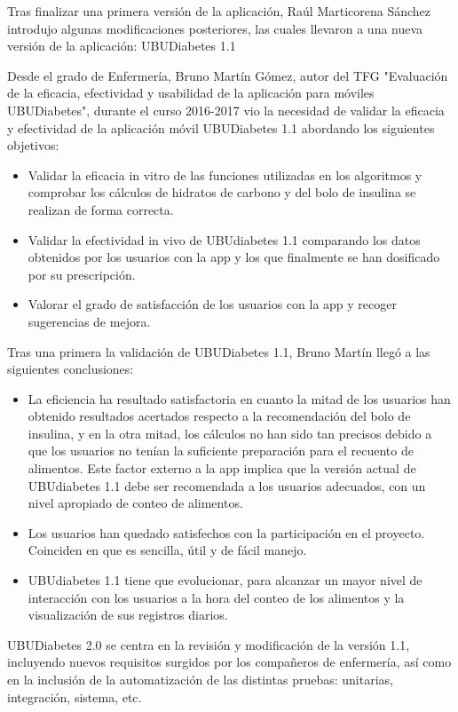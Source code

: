 Tras finalizar una primera versión de la aplicación, Raúl Marticorena Sánchez introdujo algunas modificaciones posteriores, las cuales llevaron a una nueva versión de la aplicación: UBUDiabetes 1.1

Desde el grado de Enfermería, Bruno Martín Gómez, autor del TFG "Evaluación de la eficacia, efectividad y usabilidad de la aplicación para móviles UBUDiabetes", durante el curso 2016-2017 vio la necesidad de validar la eficacia y efectividad de la aplicación móvil UBUDiabetes 1.1 abordando los siguientes objetivos\cite{bruno2017}:
\begin{itemize}
	\item Validar la eficacia in vitro de las funciones utilizadas en los algoritmos y comprobar los cálculos de hidratos de carbono y del bolo de insulina se realizan de forma correcta.
	\item Validar la efectividad in vivo de UBUdiabetes 1.1 comparando los datos obtenidos por los usuarios con la app y los que finalmente se han dosificado por su prescripción.
	\item Valorar el grado de satisfacción de los usuarios con la app y recoger sugerencias de mejora.
\end{itemize}
Tras una primera la validación de UBUDiabetes 1.1, Bruno Martín llegó a las siguientes conclusiones\cite{bruno2017}:
\begin{itemize}
	\item La eficiencia ha resultado satisfactoria en cuanto la mitad de los usuarios han obtenido resultados acertados respecto a la recomendación del bolo de insulina, y en la otra mitad, los cálculos no han sido tan precisos debido a que los usuarios no tenían la suficiente preparación para el recuento de alimentos. Este factor externo a la app implica que la versión actual de UBUdiabetes 1.1 debe ser recomendada a los usuarios adecuados, con un nivel apropiado de conteo de alimentos.
	\item Los usuarios han quedado satisfechos con la participación en el proyecto. Coinciden en que es sencilla, útil y de fácil manejo.
	\item UBUdiabetes 1.1 tiene que evolucionar, para alcanzar un mayor nivel de interacción con los usuarios a la hora del conteo de los alimentos y la visualización de sus registros diarios.
\end{itemize}

UBUDiabetes 2.0 se centra en la revisión y modificación de la versión 1.1, incluyendo nuevos requisitos surgidos por los compañeros de enfermería, así como en la inclusión de la automatización de las distintas pruebas: unitarias, integración, sistema, etc. 